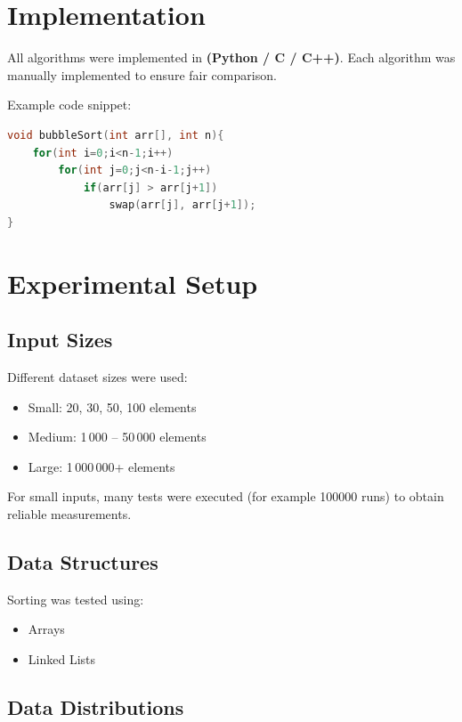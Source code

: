 \documentclass[12pt]{article}
\begin{document}
\section{Implementation}

All algorithms were implemented in \textbf{(Python / C / C++)}.  
Each algorithm was manually implemented to ensure fair comparison.

Example code snippet:

\begin{lstlisting}[language=C++]
void bubbleSort(int arr[], int n){
    for(int i=0;i<n-1;i++)
        for(int j=0;j<n-i-1;j++)
            if(arr[j] > arr[j+1])
                swap(arr[j], arr[j+1]);
}
\end{lstlisting}

\section{Experimental Setup}

\subsection{Input Sizes}

Different dataset sizes were used:

\begin{itemize}
\item Small: 20, 30, 50, 100 elements
\item Medium: 1\,000 -- 50\,000 elements
\item Large: 1\,000\,000+ elements
\end{itemize}

For small inputs, many tests were executed (for example 100000 runs) to obtain reliable measurements.

\subsection{Data Structures}

Sorting was tested using:

\begin{itemize}
\item Arrays
\item Linked Lists
\end{itemize}

\subsection{Data Distributions}
\end{document}
